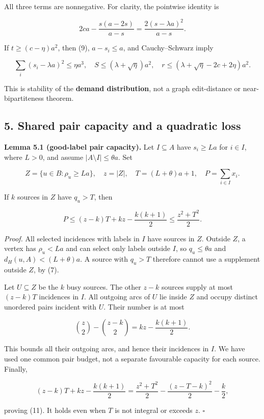 \documentclass[
  11pt,
  a4paper,
]{article}
\begin{document}
All three terms are nonnegative. For clarity, the pointwise identity is

\[2ca-\frac{s(a-2s)}{a-s}=\frac{2(s-\lambda a)^2}{a-s}.\]

If \(t\ge(c-\eta)a^2\), then (9), \(a-s_i\le a\), and Cauchy--Schwarz
imply

\[\sum_i(s_i-\lambda a)^2\le\eta a^3,\quad S\le(\lambda+\sqrt\eta)a^2,\quad r\le(\lambda+\sqrt\eta-2c+2\eta)a^2. \tag{10}\]

This is stability of the \textbf{demand distribution}, not a graph
edit-distance or near-bipartiteness theorem.

\subsection{5. Shared pair capacity and a quadratic
loss}\label{shared-pair-capacity-and-a-quadratic-loss}

\textbf{Lemma 5.1 (good-label pair capacity).} Let \(I\subseteq A\) have
\(s_i\ge La\) for \(i\in I\), where \(L>0\), and assume
\(|A\setminus I|\le\theta a\). Set

\[Z=\{u\in B:\rho_u\ge La\},\quad z=|Z|,\quad T=(L+\theta)a+1,\quad P=\sum_{i\in I}x_i.\]

If \(k\) sources in \(Z\) have \(q_u>T\), then

\[P\le(z-k)T+kz-\frac{k(k+1)}2\le\frac{z^2+T^2}{2}. \tag{11}\]

\emph{Proof.} All selected incidences with labels in \(I\) have sources
in \(Z\). Outside \(Z\), a vertex has \(\rho_u<La\) and can select only
labels outside \(I\), so \(q_u\le\theta a\) and
\(d_H(u,A)<(L+\theta)a\). A source with \(q_u>T\) therefore cannot use a
supplement outside \(Z\), by (7).

Let \(U\subseteq Z\) be the \(k\) busy sources. The other \(z-k\)
sources supply at most \((z-k)T\) incidences in \(I\). All outgoing arcs
of \(U\) lie inside \(Z\) and occupy distinct unordered pairs incident
with \(U\). Their number is at most

\[\binom z2-\binom{z-k}2=kz-\frac{k(k+1)}2.\]

This bounds all their outgoing arcs, and hence their incidences in
\(I\). We have used one common pair budget, not a separate favourable
capacity for each source. Finally,

\[(z-k)T+kz-\frac{k(k+1)}2=\frac{z^2+T^2}{2}-\frac{(z-T-k)^2}{2}-\frac k2,\]

proving (11). It holds even when \(T\) is not integral or exceeds \(z\).
\(\square\)
\end{document}
